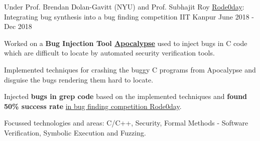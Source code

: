 \begin{cventries}




  \cventry
    {Under Prof. Brendan Dolan-Gavitt (NYU) and Prof. Subhajit Roy} %
    {\href{https://rode0day.mit.edu/}{Rode0day}: Integrating bug synthesis into a bug finding competition} %
    {IIT Kanpur} %
    {June 2018 - Dec 2018} %
    {
      \begin{cvitems} %
        \item {Worked on a \textbf{Bug Injection Tool \href{https://dl.acm.org/doi/abs/10.1145/3236024.3236084}{Apocalypse}} used to inject bugs in C code which are difficult to locate by automated security verification tools.}
        \item {Implemented techniques for crashing the buggy C programs from Apocalypse and disguise the bugs rendering them hard to locate.}
        \item {Injected \textbf{bugs in grep code} based on the implemented techniques and \textbf{found 50\% success rate} \href{https://rode0day.mit.edu/results/4}{in bug finding competition Rode0day}.}
        \item {Focussed technologies and areas: C/C++, Security, Formal Methods - Software Verification, Symbolic Execution and Fuzzing.}
      \end{cvitems}
    }






\end{cventries}
